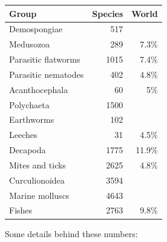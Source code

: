 \begin{center}
\begin{tabular}{lrr}
Group & Species & World \\
\hline
Demospongiae
\cite{carballo2014porifera}
& 517 &  \\
Medusozoa
\cite{gasca2014medusozoa}
& 289 & 7.3\% \\
Parasitic flatworms
\cite{garciaprieto2014platyhelminthes}
& 1015 & 7.4\% \\
Parasitic nematodes
\cite{garciaprieto2014nematoda}
& 402 & 4.8\% \\
Acanthocephala
\cite{garciaprieto2014acanthocephala}
& 60 & 5\% \\
Polychaeta
\cite{tovarhernandez2014polychaeta}
& 1500 &  \\
Earthworms
\cite{fragoso2014oligochaeta}
& 102 &  \\
Leeches
\cite{oceguera2014euhirudinea}
& 31 & 4.5\% \\
Decapoda
\cite{alvarez2014decapoda}
& 1775 & 11.9\% \\
Mites and ticks
\cite{perez2014acari}
& 2625 & 4.8\% \\
Curculionoidea
\cite{morrone2014curculionoidea}
& 3594 &  \\
Marine molluscs
\cite{castillo2014moluscos}
& 4643 &  \\
Fishes
\cite{espinosa2014peces}
& 2763 & 9.8\% \\
\end{tabular}
\end{center}

Some details behind these numbers:


